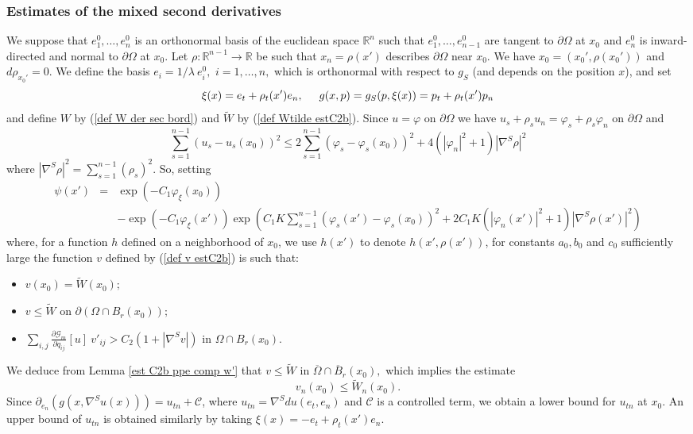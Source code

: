 \documentclass[10pt,reqno,oneside]{amsart}
\theoremstyle{definition}
\theoremstyle{remark}
\newcommand{\R}{\mathbb{R}}
\begin{document}
\subsubsection{Estimates of the mixed second derivatives}
We suppose that $e_1^0,\ldots,e_n^0$ is an orthonormal basis of the euclidean space $\R^n$ such that $e_1^0,\ldots,e_{n-1}^0$ are tangent to $\partial\Omega$ at $x_0$ and $e_n^0$ is inward-directed and normal to $\partial\Omega$ at $x_0$. Let $\rho:\R^{n-1}\rightarrow\R$ be such that $x_n=\rho(x')$ describes $\partial\Omega$ near $x_0.$ We have $x_0=(x_0',\rho(x_0'))$ and $d\rho_{x_0'}=0.$ We define the basis $e_i=1/\lambda\ e_i^0,$ $i=1,\ldots,n,$ which is orthonormal with respect to $g_S$ (and depends on the position $x$), and set
$$\xi(x)=e_t+\rho_t(x')e_n,\hspace{.5cm}g(x,p)=g_S(p,\xi(x))=p_t+\rho_t(x')p_n$$
and define $W$ by (\ref{def W der sec bord}) and $\widetilde{W}$ by (\ref{def Wtilde estC2b}). Since $u=\varphi$ on $\partial\Omega$ we have $u_s+\rho_su_n=\varphi_s+\rho_s\varphi_n$ on $\partial\Omega$ and
$$\sum_{s=1}^{n-1}(u_s-u_s(x_0))^2\leq 2\sum_{s=1}^{n-1}(\varphi_s-\varphi_s(x_0))^2+4(|\varphi_n|^2+1)|\nabla^S\rho|^2$$
where $|\nabla^S\rho|^2=\sum_{s=1}^{n-1}(\rho_s)^2.$ So, setting
\begin{eqnarray*}
\psi(x')&=&\exp(-C_1\varphi_\xi(x_0))\\
&&-\exp(-C_1\varphi_\xi(x'))\exp\left(C_1K\sum_{s=1}^{n-1}(\varphi_s(x')-\varphi_s(x_0))^2+2C_1K(|\varphi_n(x')|^2+1)|\nabla^S\rho(x')|^2\right)
\end{eqnarray*}
where, for a function $h$ defined on a neighborhood of $x_0$, we use $h(x')$ to denote $h(x',\rho(x'))$, for constants $a_0,b_0$ and $c_0$ sufficiently large the function $v$ defined by (\ref{def v estC2b}) is such that:
\begin{itemize}
\item $v(x_0)=\widetilde{W}(x_0);$
\item $v\leq \widetilde{W}$ on $\partial(\Omega\cap B_r(x_0));$
\item $\displaystyle{\sum_{i,j}\frac{\partial\mathcal{G}_m}{\partial q_{ij}}[u]\ v'_{ij}> C_2(1+|\nabla^Sv|)}$ in $\Omega\cap B_r(x_0).$
\end{itemize}
We deduce from Lemma \ref{est C2b ppe comp w'} that $v\leq \widetilde{W}$ in $\overline{\Omega}\cap \overline{B}_r(x_0),$ which implies the estimate 
\begin{equation}\label{est unn vn Wn}
v_n(x_0)\leq\widetilde{W}_n(x_0).
\end{equation} 
Since $\partial_{e_n}(g(x,\nabla^Su(x)))=u_{tn}+\mathcal{C}$, where $u_{tn}=\nabla^Sdu(e_t,e_n)$ and $\mathcal{C}$ is a controlled term, we obtain a lower bound for $u_{tn}$ at $x_0.$ An upper bound of $u_{tn}$ is obtained similarly by taking $\xi(x)=-e_t+\rho_t(x')e_n.$
$ $\\
\end{document}
